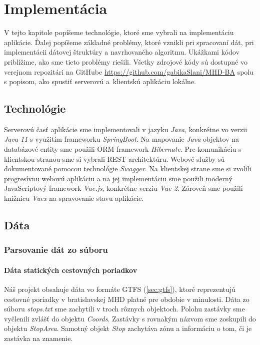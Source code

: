 \chapter{Implementácia}
\label{kap:imp}
V tejto kapitole popíšeme technológie, ktoré sme vybrali na implementáciu aplikácie. Ďalej popíšeme základné problémy, ktoré vznikli pri spracovaní dát, pri implementácii dátovej štruktúry a navrhovaného algoritmu. Ukážkami kódov priblížime, ako sme tieto problémy riešili. Všetky zdrojové kódy sú dostupné vo verejnom repozitári na GitHube \href{https://github.com/gabikaSlani/MHD-BA}{https://github.com/gabikaSlani/MHD-BA} spolu s popisom, ako spustiť serverovú a~klientskú aplikáciu lokálne.

\section{Technológie}
Serverovú časť aplikácie sme implementovali v jazyku \textit{Java}, konkrétne vo verzii \textit{Java 11} s využitím frameworku \textit{SpringBoot}. Na mapovanie \textit{Java} objektov na databázové entity sme použili ORM framework \textit{Hibernate}. Pre komunikáciu s klientskou stranou sme si vybrali REST architektúru. Webové služby sú dokumentované pomocou technológie \textit{Swagger}. Na klientskej strane sme si zvolili progresívnu webovú aplikáciu a na jej implementáciu sme použili moderný JavaScriptový framework \textit{Vue.js}, konkrétne verziu \textit{Vue 2}. Zároveň sme použili knižnicu \textit{Vuex} na spravovanie stavu aplikácie. 

\section{Dáta}
\subsection{Parsovanie dát zo súboru}
\label{sec:parsing}
\subsubsection{Dáta statických cestovných poriadkov}
Náš projekt obsahuje dáta vo formáte GTFS (\ref{sec:gtfs}), ktoré reprezentujú cestovné poriadky v bratislavskej MHD platné pre obdobie v minulosti. 
Dáta zo súboru \textit{stops.txt} sme zachytili v troch rôznych objektoch. Polohu zastávky sme vyčlenili zvlášť do objektu \textit{Coords}. Zastávky s rovnakým názvom sme zoskupili do objektu \textit{StopArea}. Samotný objekt \textit{Stop} zachytáva zónu a informáciu o tom, či je zastávka na znamenie. 

